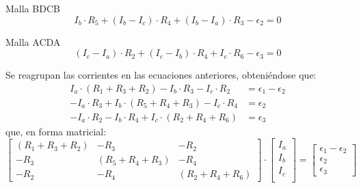 \documentclass[11pt]{book} %
\begin{document}
\begin{example}
\begin{enumerate}
			Malla BDCB
			\begin{equation*}
				I_b \cdot R_5 + (I_b - I_c) \cdot R_4 + (I_b - I_a) \cdot R_3 - \epsilon_2 = 0
			\end{equation*}
			
			Malla ACDA
			\begin{equation*}
				(I_c - I_a) \cdot R_2 + (I_c - I_b) \cdot R_4 + I_c \cdot R_6 - \epsilon_3 = 0
			\end{equation*}
			
			Se reagrupan las corrientes en las ecuaciones anteriores, obteniéndose que: 
			\begin{align*}
				I_a \cdot (R_1 + R_3 + R_2)  - I_b\cdot R_3 - I_c \cdot R_2 &= \epsilon_1 - \epsilon_2\\
				- I_a \cdot R_3 + I_b \cdot (R_5 + R_4 + R_3) - I_c \cdot R_4 &=  \epsilon_2\\
				- I_a \cdot R_2 - I_b \cdot R_4 + I_c \cdot (R_2 + R_4 + R_6) &= \epsilon_3
			\end{align*}
			que, en forma matricial: 
			\begin{equation*}
				\begin{bmatrix}
					(R_1 + R_3 + R_2) &  - R_3 & - R_2 \\
					- R_3 & (R_5 + R_4 + R_3) & - R_4 \\
					- R_2 & - R_4 &  (R_2 + R_4 + R_6)
				\end{bmatrix} \cdot %
				\begin{bmatrix}
					I_a\\
					I_b\\
					I_c\\
				\end{bmatrix} = %
				\begin{bmatrix}
					\epsilon_1 - \epsilon_2\\
					\epsilon_2\\
					\epsilon_3
				\end{bmatrix}
			\end{equation*}
		\end{enumerate}
	\end{example}
	
\end{document}
